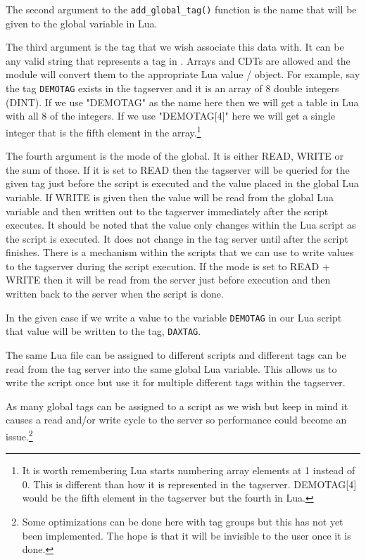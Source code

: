 The second argument to the \texttt{add\_global\_tag()} function is the name that will be given to
the global variable in Lua.

The third argument is the \opendax tag that we wish associate this data with.  It can be any
valid string that represents a tag in \opendax.  Arrays and CDTs are allowed and the module
will convert them to the appropriate Lua value / object.  For example, say the tag \texttt{DEMOTAG}
exists in the tagserver and it is an array of 8 double integers (DINT).  If we use "DEMOTAG" as the
name here then we will get a table in Lua with all 8 of the integers.  If we use "DEMOTAG[4]" here
we will get a single integer that is the fifth element in the array.\footnote{It is worth remembering
Lua starts numbering array elements at 1 instead of 0.  This is different than how it is represented in
the tagserver.  DEMOTAG[4] would be the fifth element in the tagserver but the fourth in Lua.}

The fourth argument is the mode of the global.  It is either READ, WRITE or the sum of those.  If
it is set to READ then the tagserver will be queried for the given tag just before the script
is executed and the value placed in the global Lua variable.  If WRITE is given then the value
will be read from the global Lua variable and then written out to the tagserver immediately after
the script executes.  It should be noted that the value only changes within the Lua script as
the script is executed.  It does not change in the tag server until after the script finishes.
There is a mechanism within the scripts that we can use to write values to the tagserver during
the script execution.  If the mode is set to READ + WRITE then it will be read from the server
just before execution and then written back to the server when the script is done.

In the given case if we write a value to the variable \texttt{DEMOTAG} in our Lua script
that value will be written to the \opendax tag, \texttt{DAXTAG}.

The same Lua file can be assigned to different scripts and different tags can be read from the
tag server into the same global Lua variable.  This allows us to write the script once but use
it for multiple different tags within the tagserver.

As many global tags can be assigned to a script as we wish but keep in mind it causes a read and/or
write cycle to the server so performance could become an issue.\footnote{Some optimizations can be done
here with tag groups but this has not yet been implemented.  The hope is that it will be invisible
to the user once it is done.}

